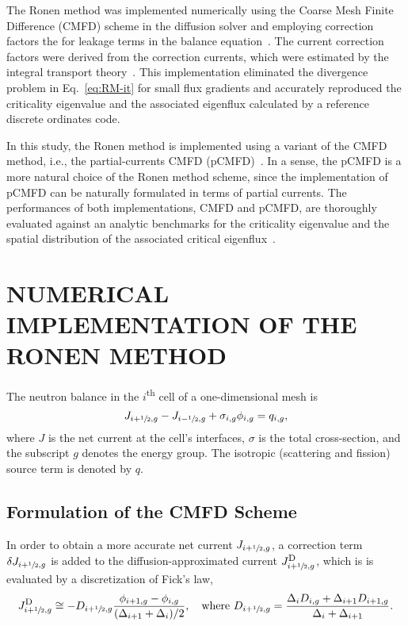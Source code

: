 \documentclass[letterpaper]{mc2021}
\newcommand{\tsup}[1]{\textsuperscript{#1}}
\newcommand{\hzi}{\ensuremath{\sfrac{1}{2}}}
\newcommand{\jD}{\ensuremath{J^{\textrm{\scriptsize{D}}}}}
\begin{document}
\vspace{-10.5mm}

The Ronen method was implemented numerically using the Coarse Mesh Finite Difference (CMFD) scheme in the diffusion solver and employing correction factors the for leakage terms in the balance equation~\cite{Tomatis-2011}. The current correction factors were derived from the correction currents, which were estimated by the integral transport theory~\cite{Gross-2020}. This implementation eliminated the divergence problem in Eq.~\eqref{eq:RM-it} for small flux gradients and accurately reproduced the criticality eigenvalue and the associated eigenflux calculated by a reference discrete ordinates code. 

\vspace{-1.5mm}

In this study, the Ronen method is implemented using a variant of the CMFD method, i.e., the partial-currents CMFD (pCMFD)~\cite{Cho-2003}. In a sense, the pCMFD is a more natural choice of the Ronen method scheme, since the implementation of pCMFD can be naturally formulated in terms of partial currents. The performances of both implementations, CMFD and pCMFD, are thoroughly evaluated against an analytic benchmarks for the criticality eigenvalue and the spatial distribution of the associated critical eigenflux~\cite{Sood2003}.    

\section{NUMERICAL IMPLEMENTATION OF THE RONEN METHOD} 
\label{sec:num-imp}

The neutron balance in the $i$\tsup{th} cell of a one-dimensional mesh is
\begin{equation}
\label{eq:balance}
J_{i+\hzi,g} - J_{i-\hzi,g} + \sigma_{i,g} \phi_{i,g} = q_{i,g},
\end{equation}
where $J$ is the net current at the cell's interfaces, $\sigma$ is the total cross-section, and the subscript $g$ denotes the energy group. The isotropic (scattering and fission) source term is denoted by $q$.

\vspace{-1.5mm}

\subsection{Formulation of the CMFD Scheme} 
\label{sec:cmfd}

In order to obtain a more accurate net current $J_{i+\hzi,g}$, a correction term $\delta J_{i+\hzi,g}$ is added to the diffusion-approximated current $\jD_{i+\hzi,g}$, which is is evaluated by a discretization of Fick's law, 
\begin{equation}
\label{eq:JD}
\jD_{i+\hzi,g} \cong - D_{i+\hzi,g}
\frac{\phi_{i+1,g} - \phi_{i,g}}{(\Delta_{i+1} + \Delta_i)/2},
\quad \text{where }
D_{i+\hzi,g} = \frac{\Delta_i D_{i,g} + \Delta_{i+1} D_{i+1,g}}
{\Delta_i + \Delta_{i+1}}.
\end{equation}
\end{document}
